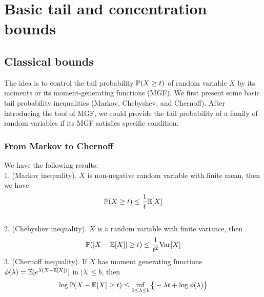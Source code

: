 \section{Basic tail and concentration bounds}

\subsection{Classical bounds}

The idea is to control the tail probability ${\mathbb{P}}(X\ge t)$ of random variable $X$ by its moments or its moment-generating functions (MGF). We first present some basic tail probability inequalities (Markov, Chebyshev, and Chernoff). After introducing the tool of MGF, we could provide the tail probability of a family of random variables if its MGF satisfies specific condition.

\subsubsection{From Markov to Chernoff}

\begin{claim} We have the following results:\\
1. (Markov inequality). $X$ is non-negative random variable with finite mean, then we have
\begin{equation}
    {\mathbb{P}}(X\ge t) \le \frac{1}{t} {\mathbb{E}}[X]
\end{equation}\\
2. (Chebyshev inequality). $X$ is a random variable with finite variance, then 
\begin{equation}
    {\mathbb{P}}(|X-{\mathbb{E}}[X]|\ge t) \le \frac{1}{t^2} {\mathrm{Var}}[X]
\end{equation}
3. (Chernoff inequality). If $X$ has moment generating functions $\phi(\lambda)={\mathbb{E}}[e^{\lambda(X-{\mathbb{E}}[X])}]$ in $|\lambda|\le b$, then 
\begin{equation}
\label{eqn:chernoff}
    \log {\mathbb{P}}(X-{\mathbb{E}}[X] \ge t)\le \inf_{0\le \lambda\le b}\big\{ -\lambda t + \log \phi(\lambda) \big\}
\end{equation}
\end{claim}

